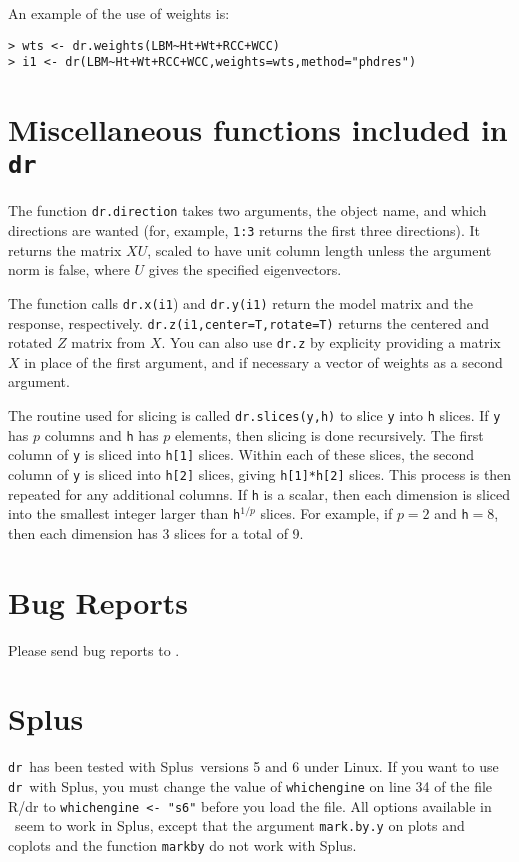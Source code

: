 \documentclass{article}
\newcommand{\Splus}{{\normalfont\textsf{Splus}}{}}
\newcommand{\dcode}[1]{{\small{\tt #1}}}
\newcommand{\ir}{{\tt dr}}
\newcommand{\dr}{{\tt dr}}
\begin{document}
An example of the use of weights is:
\begin{verbatim}
> wts <- dr.weights(LBM~Ht+Wt+RCC+WCC)
> i1 <- dr(LBM~Ht+Wt+RCC+WCC,weights=wts,method="phdres")
\end{verbatim}

\section{Miscellaneous functions included in \ir}
The function \dcode{dr.direction} takes two arguments, the object
name, and which directions are wanted (for, example, \dcode{1:3}
returns the first three directions).  It returns the matrix $XU$,
scaled to have unit column length unless the argument norm is
false, where $U$ gives the specified eigenvectors.

The function calls \dcode{dr.x(i1}) and \dcode{dr.y(i1)} return the model
matrix and the response, respectively.
\dcode{dr.z(i1,center=T,rotate=T)} returns the centered and rotated $Z$ matrix
from $X$.  You can also use \dcode{dr.z} by explicity providing a
matrix $X$ in place of the first argument, and if necessary a
vector of weights as a second argument.

The routine used for slicing is called
\dcode{dr.slices(y,h)} to slice \dcode{y} into \dcode{h} slices.  If \dcode{y} has
$p$ columns and \dcode{h} has $p$ elements, then slicing is done
recursively.  The first column of \dcode{y} is sliced into
\dcode{h[1]} slices.  Within each of these slices, the second
column of \dcode{y} is sliced into \dcode{h[2]} slices, giving
\dcode{h[1]*h[2]} slices. This process is then repeated for any
additional columns.  If \dcode{h} is a scalar, then each dimension
is sliced into the smallest integer larger than \dcode{h}$^{1/p}$
slices.  For example, if $p=2$ and \dcode{h}$=8$, then each
dimension has 3 slices for a total of 9.


\section{Bug Reports}
Please send bug reports to
.

\section{\Splus}
\dr\ has been tested with \Splus\ versions 5 and 6
under Linux.  If you want to use \dr\ with \Splus, you must change the
value of \dcode{whichengine} on line 34 of the file R/dr to
\dcode{whichengine <- "s6"} before you load the file.
All options available in \R\ seem to work in \Splus, except that the argument
\dcode{mark.by.y} on plots and coplots and the function
\dcode{markby} do not work with \Splus.
\end{document}

